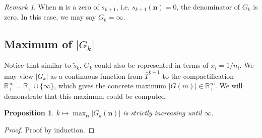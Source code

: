 \documentclass{article}
\theoremstyle{definition}
\theoremstyle{plain}
\newtheorem{proposition}{Proposition}[section]
\theoremstyle{remark}
\newtheorem*{remark}{Remark}
\numberwithin{equation}{section}
\newcommand{\real}{\mathbb{R}}
\newcommand{\abs}[1]{\left\lvert{#1}\right\rvert}
\begin{document}
\begin{remark}
  When $\mathbf{n}$ is a zero of $s_{k+1}$, i.e. $s_{k+1}(\mathbf{n}) = 0$,
  the denominator of $G_k$ is zero. In this case, we may say $G_k = \infty$.
\end{remark}

\subsection{Maximum of $\abs{G_k}$}

Notice that similar to $\tilde{s}_k$,
$G_k$ could also be represented in terms of $x_i = 1 / n_i$.
We may view $\abs{G_k}$ as a continuous function
from $\bar{T}^{k-1}$ to the compactification $\real_{+}^\infty = \real_{+} \cup \{ \infty \}$,
which gives the concrete maximum $\abs{G(m)} \in \real_{+}^\infty$.
We will demonstrate that this maximum could be computed.

\begin{proposition}
  $k \mapsto \max_{\mathbf{n}} \abs{G_k(\mathbf{n})}$ is strictly increasing until $\infty$.
\end{proposition}
\begin{proof}
  Proof by induction.
\end{proof}
\end{document}
